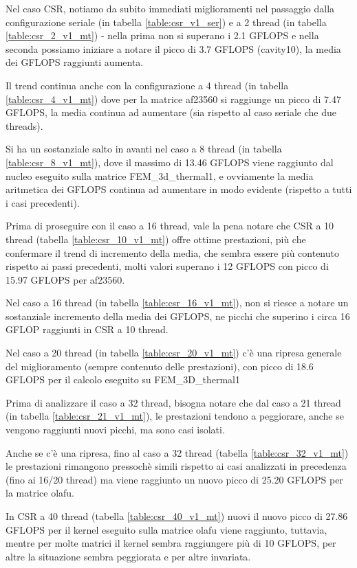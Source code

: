 \documentclass[a4paper,9pt]{extarticle}
\begin{document}
Nel caso CSR, notiamo da subito immediati miglioramenti nel passaggio dalla configurazione seriale
(in tabella \ref{table:csr_v1_ser}) e a 2 thread (in tabella \ref{table:csr_2_v1_mt}) - nella
prima non si superano i 2.1 GFLOPS e nella seconda possiamo iniziare a notare il picco di 3.7 GFLOPS (cavity10), la media dei GFLOPS raggiunti aumenta. 

Il trend continua anche con la
configurazione a 4 thread (in tabella \ref{table:csr_4_v1_mt}) dove per la matrice af23560 si
raggiunge un picco di 7.47 GFLOPS, la media continua ad aumentare (sia rispetto al caso seriale
che due threads).

Si ha un sostanziale salto in avanti nel caso a 8 thread (in tabella \ref{table:csr_8_v1_mt}), dove il massimo di 13.46 GFLOPS viene 
raggiunto dal nucleo eseguito sulla matrice FEM\_3d\_thermal1, e ovviamente la media aritmetica 
dei GFLOPS continua ad aumentare in modo evidente (rispetto a tutti i casi precedenti).

Prima di proseguire con il caso a 16 thread, vale la pena notare che CSR a 10 thread (tabella \ref{table:csr_10_v1_mt}) offre
ottime prestazioni, più che confermare il trend di incremento della media, che sembra essere più
contenuto rispetto ai passi precedenti, molti valori superano i 12 GFLOPS con picco di 15.97 
GFLOPS per af23560.

Nel caso a 16 thread (in tabella \ref{table:csr_16_v1_mt}), 
non si riesce a notare un sostanziale incremento della media dei GFLOPS,
ne picchi che superino i circa 16 GFLOP raggiunti in CSR a 10 thread.

Nel caso a 20 thread (in tabella \ref{table:csr_20_v1_mt}) c'è una ripresa generale del
miglioramento (sempre contenuto delle prestazioni), con picco di 18.6 GFLOPS per il 
calcolo eseguito su FEM\_3D\_thermal1

Prima di analizzare il caso a 32 thread, bisogna notare che dal caso a 21 thread (in tabella \ref{table:csr_21_v1_mt}), le prestazioni tendono a peggiorare, anche se vengono raggiunti nuovi
picchi, ma sono casi isolati. 

Anche se c'è una ripresa, fino al caso a 32
thread (tabella \ref{table:csr_32_v1_mt}) le prestazioni rimangono pressochè simili rispetto
ai casi analizzati in precedenza (fino ai 16/20 thread) ma viene raggiunto un nuovo picco di 
25.20 GFLOPS per la matrice olafu.

In CSR a 40 thread (tabella \ref{table:csr_40_v1_mt}) nuovi il nuovo picco di 27.86 GFLOPS per 
il kernel eseguito sulla matrice olafu viene raggiunto, tuttavia, mentre per molte matrici il 
kernel sembra raggiungere più di 10 GFLOPS, per altre la situazione sembra peggiorata e per altre
invariata.
\end{document}
